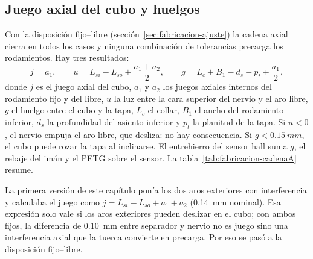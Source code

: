 \subsection{Juego axial del cubo y huelgos}\label{sec:fabricacion-cadenaA}

Con la disposición fijo--libre (sección~\ref{sec:fabricacion-ajuste}) la cadena axial cierra
en todos los casos y ninguna combinación de tolerancias precarga los rodamientos. Hay tres
resultados:
\begin{equation}
  j = a_1 ,\qquad
  u = L_{si} - L_{so} \pm \frac{a_1+a_2}{2},\qquad
  g = L_c + B_1 - d_s - p_t \mp \frac{a_1}{2},
  \label{eq:fabricacion-juego}
\end{equation}
donde $j$ es el juego axial del cubo, $a_1$ y $a_2$ los juegos axiales internos del
rodamiento fijo y del libre, $u$ la luz entre la cara superior del nervio y el aro libre,
$g$ el huelgo entre el cubo y la tapa, $L_c$ el collar, $B_1$ el ancho del rodamiento
inferior, $d_s$ la profundidad del asiento inferior y $p_t$ la planitud de la tapa. Si
$u<0$, el nervio empuja el aro libre, que desliza: no hay consecuencia. Si
$g<\SI{0.15}{mm}$, el cubo puede rozar la tapa al inclinarse. El entrehierro del sensor
hall suma $g$, el rebaje del imán y el PETG sobre el sensor. La
tabla~\ref{tab:fabricacion-cadenaA} resume.

\begin{nota}
La primera versión de este capítulo ponía los dos aros exteriores con interferencia y
calculaba el juego como $j=L_{si}-L_{so}+a_1+a_2$ (\SI{0.14}{mm} nominal). Esa expresión solo
vale si los aros exteriores pueden deslizar en el cubo; con ambos fijos, la diferencia de
\SI{0.10}{mm} entre separador y nervio no es juego sino una interferencia axial que la tuerca
convierte en precarga. Por eso se pasó a la disposición fijo--libre.
\end{nota}

